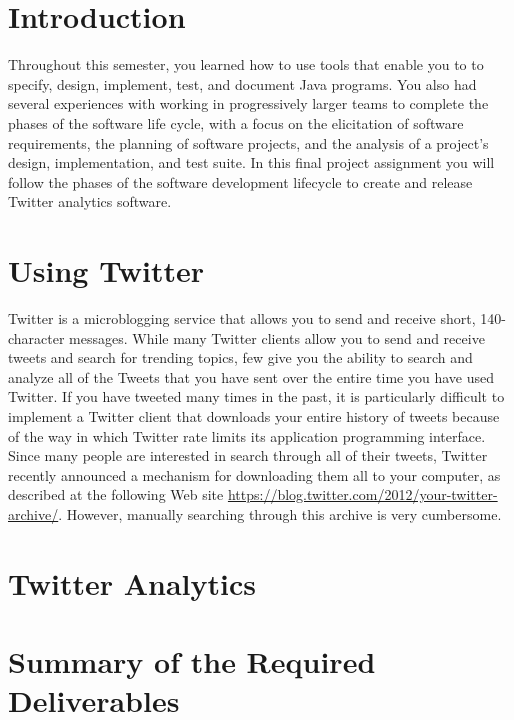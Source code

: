 

\usepackage[compact]{titlesec}



\section*{Introduction} 

Throughout this semester, you learned how to use tools that enable you to to specify, design, implement, test, and
document Java programs.  You also had several experiences with working in progressively larger teams to complete the
phases of the software life cycle, with a focus on the elicitation of software requirements, the planning of software
projects, and the analysis of a project's design, implementation, and test suite.  In this final project assignment you
will follow the phases of the software development lifecycle to create and release Twitter analytics software.

\section*{Using Twitter}

Twitter is a microblogging service that allows you to send and receive short, 140-character messages.  While many
Twitter clients allow you to send and receive tweets and search for trending topics, few give you the ability to search
and analyze all of the Tweets that you have sent over the entire time you have used Twitter. If you have tweeted many
times in the past, it is particularly difficult to implement a Twitter client that downloads your entire history of
tweets because of the way in which Twitter rate limits its application programming interface.  Since many people are
interested in search through all of their tweets, Twitter recently announced a mechanism for downloading them all to
your computer, as described at the following Web site \url{https://blog.twitter.com/2012/your-twitter-archive/}.
However, manually searching through this archive is very cumbersome. 

\section*{Twitter Analytics}

\section*{Summary of the Required Deliverables}

